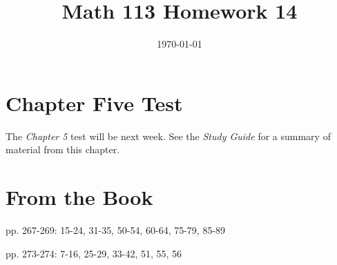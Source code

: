 \documentclass[fleqn,addpoints]{exam}
\title{Math 113 Homework 14}
\author{}
\date{\today}
\begin{document}
\maketitle

\ifprintanswers
\else
\section{Chapter Five Test}

The {\em Chapter 5} test will be next week.  See the {\em Study Guide} for a summary of material from this chapter.

\fi

\section{From the Book}

\begin{itemize*}
  \item pp. 267-269: 15-24, 31-35, 50-54, 60-64, 75-79, 85-89
  \item pp. 273-274: 7-16, 25-29, 33-42, 51, 55, 56
\end{itemize*}

\ifprintanswers
\end{document}
